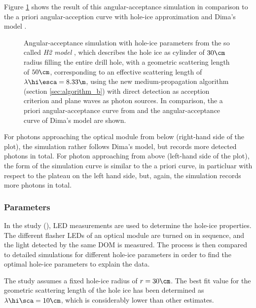 
Figure \ref{fig:xaeg2Mee} shows the result of this angular-acceptance simulation in comparison to the a priori angular-acception curve with hole-ice approximation \cite{icepaper} and Dima's model \cite{flasherdataderivedicemodels}.

\begin{figure}[htbp]
  \caption{Angular-acceptance simulation with hole-ice parameters from the so called \textit{H2 model} \cite{holeicestudieswithyag}, which describes the hole ice as cylinder of $30\cm$ radius filling the entire drill hole, with a geometric scattering length of $50\cm$, corresponding to an effective scattering length of $\lambda\hi\esca = 8.33\m$, using the new medium-propagation algorithm (section \ref{sec:algorithm_b}) with direct detection as acception criterion and plane waves as photon sources. In comparison, the a priori angular-acceptance curve from \cite{icepaper} and the angular-acceptance curve of Dima's model \cite{flasherdataderivedicemodels} are shown.}
  \label{fig:xaeg2Mee}
\end{figure}

For photons approaching the optical module from below (right-hand side of the plot), the simulation rather follows Dima's model, but records more detected photons in total. For photon approaching from above (left-hand side of the plot), the form of the simulation curve is similar to the a priori curve, in particluar with respect to the plateau on the left hand side, but, again, the simulation records more photons in total.


\subsubsection{ Parameters}
\label{sec:dard_parameters}

In the  study (), LED measurements are used to determine the hole-ice properties. The different flasher LEDs of an optical module are turned on in sequence, and the light detected by the same DOM is measured. The process is then compared to detailed  simulations for different hole-ice parameters in order to find the optimal hole-ice parameters to explain the data. \cite{martindardupdate}\cite{martinspicehddard}

The  study assumes a fixed hole-ice radius of $r=30\cm$. The best fit value for the geometric scattering length of the hole ice has been determined as $\lambda\hi\sca = 10\cm$, which is considerably lower than other estimates. \cite{martindardupdate}

